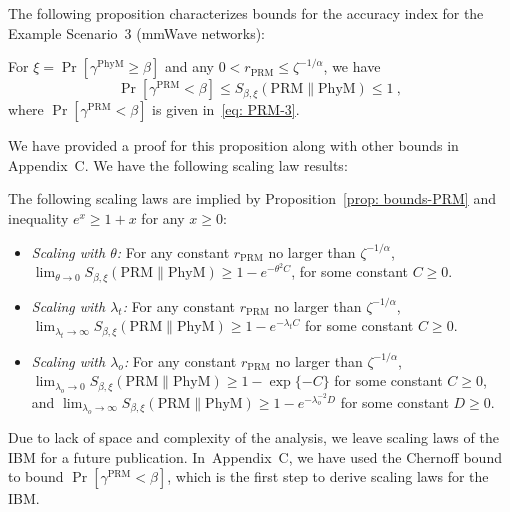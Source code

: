 \documentclass[12pt, draftclsnofoot, onecolumn]{IEEEtran}
\begin{document}
The following proposition characterizes bounds for the accuracy index for the Example Scenario~3 (mmWave networks):
\begin{prop}\label{prop: bounds-PRM}
For $\xi = \Pr \left[ \gamma^{\mathrm{PhyM}} \geq \beta \right]$ and any $0 < r_{\mathrm{PRM}} \leq \zeta^{-1/\alpha}$, we have
\begin{equation*}
\Pr \left[\gamma^{\mathrm{PRM}}  < \beta \right] \leq S_{\beta,\xi}\left(\mathrm{PRM}\|\mathrm{PhyM} \right) \leq 1 \:,
\end{equation*}
where $\Pr \left[\gamma^{\mathrm{PRM}}  < \beta \right]$ is given in~\eqref{eq: PRM-3}.
\end{prop}
We have provided a proof for this proposition along with other bounds in Appendix~C. We have the following scaling law results:
\begin{result}
The following scaling laws are implied by Proposition~\ref{prop: bounds-PRM} and inequality $e^{x} \geq 1+x$ for any $x\geq 0$:
\begin{itemize}
  \item \emph{Scaling with $\theta$:} For any constant $r_{\mathrm{PRM}}$ no larger than $\zeta^{-1/\alpha}$, $\lim_{\theta \to 0} S_{\beta,\xi}\left(\mathrm{PRM}\|\mathrm{PhyM} \right) \geq 1 - e^{-\theta^2 C}$, for some constant $C\geq0$.
  \item \emph{Scaling with $\lambda_t$:} For any constant $r_{\mathrm{PRM}}$ no larger than $\zeta^{-1/\alpha}$, $\lim_{\lambda_t \to \infty} S_{\beta,\xi}\left(\mathrm{PRM}\|\mathrm{PhyM} \right) \geq 1 - e^{-\lambda_t C}$ for some constant $C\geq0$.
  \item \emph{Scaling with $\lambda_o$:} For any constant $r_{\mathrm{PRM}}$ no larger than $\zeta^{-1/\alpha}$, $\lim_{\lambda_o \to 0} S_{\beta,\xi}\left(\mathrm{PRM}\|\mathrm{PhyM} \right) \geq 1 - \exp\{-C\}$ for some constant $C\geq0$, and $\lim_{\lambda_o \to \infty} S_{\beta,\xi}\left(\mathrm{PRM}\|\mathrm{PhyM} \right) \geq 1 - e^{-\lambda_{o}^{-2}D}$ for some constant $D\geq0$.
\end{itemize}
\end{result}
Due to lack of space and complexity of the analysis, we leave scaling laws of the IBM for a future publication. In~Appendix~C, we have used the Chernoff bound to bound $\Pr \left[\gamma^{\mathrm{PRM}}  < \beta \right]$, which is the first step to derive scaling laws for the IBM.
\end{document}
